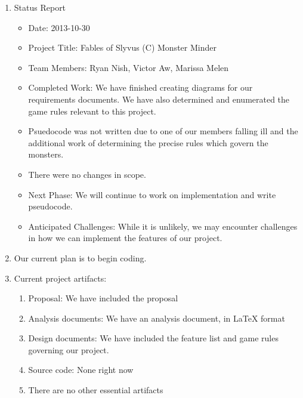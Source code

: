 \documentclass[letterpaper,12pt]{letter}
\begin{document}
\begin{enumerate}
\item Status Report
\begin{itemize}
\item Date: 2013-10-30
\item Project Title: Fables of Slyvus (C) Monster Minder
\item Team Members: Ryan Nish, Victor Aw, Marissa Melen
\item Completed Work: We have finished creating diagrams for our
  requirements documents. We have also determined and enumerated the
  game rules relevant to this project.
\item Psuedocode was not written due to one of our members falling ill
  and the additional work of determining the precise rules which
  govern the monsters.
\item There were no changes in scope.
\item Next Phase: We will continue to work on implementation and write pseudocode.
\item Anticipated Challenges: While it is unlikely, we may encounter
  challenges in how we can implement the features of our project.
\end{itemize}
\item Our current plan is to begin coding.
\item Current project artifacts:
\begin{enumerate}
\item Proposal: We have included the proposal 
\item Analysis documents: We have an analysis document, in LaTeX format
\item Design documents: We have included the feature list and game
  rules governing our project.
\item Source code: None right now
\item There are no other essential artifacts
\end{enumerate}
\end{enumerate}
\end{document}
